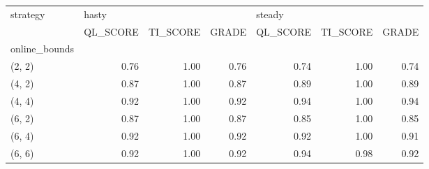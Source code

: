 \begin{tabular}{lrrrrrr}
\toprule
strategy & \multicolumn{3}{l}{hasty} & \multicolumn{3}{l}{steady} \\
{} & QL\_SCORE & TI\_SCORE & GRADE & QL\_SCORE & TI\_SCORE & GRADE \\
online\_bounds &          &          &       &          &          &       \\
\midrule
(2, 2)        &     0.76 &     1.00 &  0.76 &     0.74 &     1.00 &  0.74 \\
(4, 2)        &     0.87 &     1.00 &  0.87 &     0.89 &     1.00 &  0.89 \\
(4, 4)        &     0.92 &     1.00 &  0.92 &     0.94 &     1.00 &  0.94 \\
(6, 2)        &     0.87 &     1.00 &  0.87 &     0.85 &     1.00 &  0.85 \\
(6, 4)        &     0.92 &     1.00 &  0.92 &     0.92 &     1.00 &  0.91 \\
(6, 6)        &     0.92 &     1.00 &  0.92 &     0.94 &     0.98 &  0.92 \\
\bottomrule
\end{tabular}
